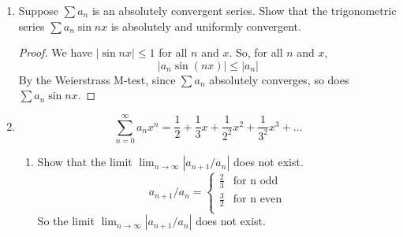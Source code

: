 \documentclass[hidelinks,12pt]{article}
\title{\scalebox{2}{Math 524 Homework 3}}
\author{\scalebox{1.5}{Theo Koss}}
\date{March 2024}
\renewcommand{\leq}{\leqslant}
\begin{document}
\maketitle
\begin{enumerate}
    \item Suppose $\sum a_n$ is an absolutely convergent series. Show that the trigonometric series $\sum a_n\sin nx$ is absolutely and uniformly convergent.
        \begin{proof}[Proof]
            We have $|\sin nx|\leq1$ for all $n$ and $x$. So, for all $n$ and $x$, \[|a_n\sin(nx)|\leq|a_n|\] By the Weierstrass M-test, since $\sum a_n$ absolutely converges, so does $\sum a_n\sin nx$.
        \end{proof}
    \item \[\sum_{n=0}^{\infty}a_nx^n=\frac{1}{2}+\frac{1}{3}x+\frac{1}{2^2}x^2+\frac{1}{3^2}x^3+\dots\]
        \begin{enumerate}
            \item Show that the limit $\lim_{n\to\infty}|a_{n+1}/a_n|$ does not exist.
                \[a_{n+1}/a_n=\begin{cases}
                    \frac{2}{3} & \text{for n odd}\\
                    \frac{3}{2} & \text{for n even}\\
                \end{cases}\]
                So the limit $\lim_{n\to\infty}|a_{n+1}/a_n|$ does not exist.


\end{enumerate}
\end{enumerate}
\end{document}
